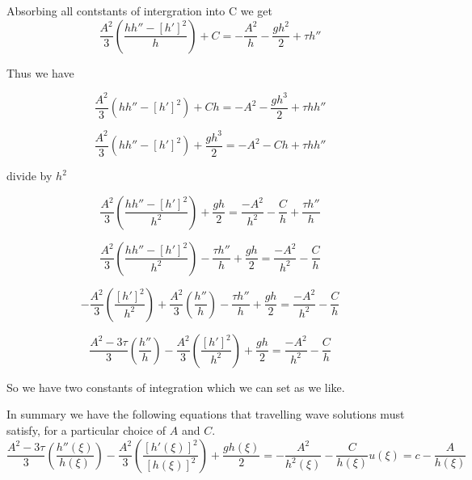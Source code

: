\documentclass[subeqn]{article}
\begin{document}
Absorbing all contstants of intergration into C we get
\begin{equation*}
\frac{A^2}{3} \left(\frac{h h'' - \left[h'\right]^2}{h}  \right) + C  =  -\frac{A^2}{h} - \frac{gh^2}{2} + \tau h''
\end{equation*}

Thus we have

\begin{equation*}
\frac{A^2}{3} \left({h h'' - \left[h'\right]^2}  \right) + Ch  =  -{A^2} - \frac{gh^3}{2} + \tau h h''
\end{equation*}

\begin{equation*}
\frac{A^2}{3} \left({h h'' - \left[h'\right]^2} \right) + \frac{gh^3}{2}   =  -{A^2} - Ch + \tau h h''
\end{equation*}

divide by $h^2$

\begin{equation*}
\frac{A^2}{3} \left(\frac{h h'' - \left[h'\right]^2}{h^2} \right) + \frac{gh}{2}   =  \frac{-{A^2}}{h^2} - \frac{C}{h} + \frac{\tau h''}{h}
\end{equation*}

\begin{equation*}
\frac{A^2}{3} \left(\frac{h h'' - \left[h'\right]^2}{h^2} \right) - \frac{\tau h''}{h} + \frac{gh}{2}   =  \frac{-{A^2}}{h^2} - \frac{C}{h} 
\end{equation*}

\begin{equation*}
-\frac{A^2}{3} \left(\frac{ \left[h'\right]^2}{h^2} \right) + \frac{A^2}{3} \left(\frac{h''}{h} \right) - \frac{\tau h''}{h} + \frac{gh}{2}   =  \frac{-{A^2}}{h^2} - \frac{C}{h} 
\end{equation*}

\begin{equation*}
\frac{A^2 - 3\tau}{3} \left(\frac{h''}{h} \right)-\frac{A^2}{3} \left(\frac{ \left[h'\right]^2}{h^2} \right)  + \frac{gh}{2}   =  \frac{-{A^2}}{h^2} - \frac{C}{h} 
\end{equation*}


So we have two constants of integration which we can set as we like. 

In summary we have the following equations that travelling wave solutions must satisfy, for a particular choice of $A$ and $C$.
\begin{subequations}
\label{eqnSerreSat}
\begin{equation}
\label{eqnSerreSath}
\frac{A^2 - 3\tau}{3} \left(\frac{h''\left(\xi\right)}{h\left(\xi\right)} \right)  - \frac{A^2}{3} \left(\frac{ \left[h'(\xi)\right]^2}{\left[h(\xi)\right]^2} \right)  + \frac{gh(\xi)}{2}   =  -\frac{{A^2}}{h^2(\xi)} - \frac{C}{h(\xi)}
\end{equation}
\begin{equation}
\label{eqnSerreSatu}
u(\xi) = c - \frac{A}{h(\xi)}
\end{equation}
\end{subequations}
\end{document}
